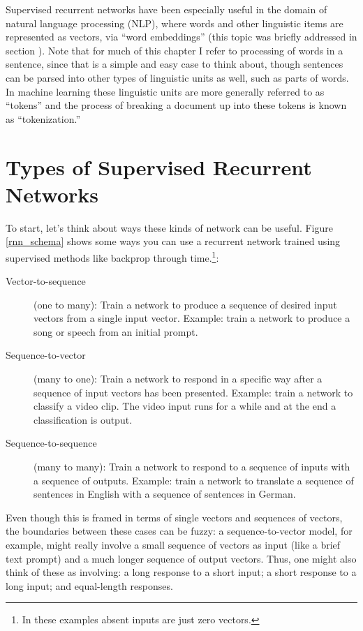Supervised recurrent networks have been especially useful in the domain of natural language processing (NLP), where words and other linguistic items are represented as vectors, via ``word embeddings'' (this topic was briefly addressed in section ).  Note that  for much of this chapter I refer to processing of words in a sentence, since that is a simple and easy case to think about, though sentences can be parsed into other types of linguistic units as well, such as parts of words. In machine learning these linguistic units are more generally referred to as ``tokens'' and the process of breaking a document up into these tokens is known as ``tokenization.''
	

\section{Types of Supervised Recurrent Networks}

To start, let's think about ways these kinds of network can be useful. Figure \ref{rnn_schema} shows some ways you can use a recurrent network trained using supervised methods like backprop through time.\footnote{In these examples absent inputs are just zero vectors.}:
\begin{description}
\item[Vector-to-sequence] (one to many):  Train a network to produce a sequence of desired input vectors from a single input vector. Example: train a network to produce a song or speech from an initial prompt.
\item[Sequence-to-vector] (many to one): Train a network to respond in a specific way after a sequence of input vectors has been presented. Example: train a network to classify a video clip. The video input runs for a while and at the end a classification is output.
\item[Sequence-to-sequence] (many to many): Train a network to respond to a sequence of inputs with a sequence of outputs. Example: train a network to translate a sequence of sentences in English with a sequence of sentences in German.
\end{description}
Even though this is framed in terms of single vectors and sequences of vectors, the boundaries between these cases can be fuzzy: a sequence-to-vector model, for example, might really involve a small sequence of vectors as input (like a brief text prompt) and a much longer sequence of output vectors. Thus, one might also think of these as involving: a long response to a short input; a short response to a long input; and equal-length responses.


